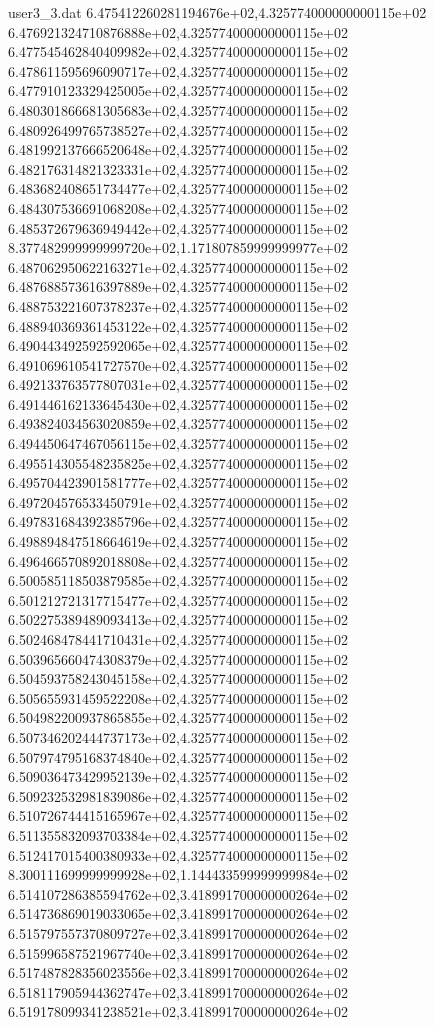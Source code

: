 \begin{filecontents}{user3_3.dat}
6.475412260281194676e+02,4.325774000000000115e+02
6.476921324710876888e+02,4.325774000000000115e+02
6.477545462840409982e+02,4.325774000000000115e+02
6.478611595696090717e+02,4.325774000000000115e+02
6.477910123329425005e+02,4.325774000000000115e+02
6.480301866681305683e+02,4.325774000000000115e+02
6.480926499765738527e+02,4.325774000000000115e+02
6.481992137666520648e+02,4.325774000000000115e+02
6.482176314821323331e+02,4.325774000000000115e+02
6.483682408651734477e+02,4.325774000000000115e+02
6.484307536691068208e+02,4.325774000000000115e+02
6.485372679636949442e+02,4.325774000000000115e+02
8.377482999999999720e+02,1.171807859999999977e+02
6.487062950622163271e+02,4.325774000000000115e+02
6.487688573616397889e+02,4.325774000000000115e+02
6.488753221607378237e+02,4.325774000000000115e+02
6.488940369361453122e+02,4.325774000000000115e+02
6.490443492592592065e+02,4.325774000000000115e+02
6.491069610541727570e+02,4.325774000000000115e+02
6.492133763577807031e+02,4.325774000000000115e+02
6.491446162133645430e+02,4.325774000000000115e+02
6.493824034563020859e+02,4.325774000000000115e+02
6.494450647467056115e+02,4.325774000000000115e+02
6.495514305548235825e+02,4.325774000000000115e+02
6.495704423901581777e+02,4.325774000000000115e+02
6.497204576533450791e+02,4.325774000000000115e+02
6.497831684392385796e+02,4.325774000000000115e+02
6.498894847518664619e+02,4.325774000000000115e+02
6.496466570892018808e+02,4.325774000000000115e+02
6.500585118503879585e+02,4.325774000000000115e+02
6.501212721317715477e+02,4.325774000000000115e+02
6.502275389489093413e+02,4.325774000000000115e+02
6.502468478441710431e+02,4.325774000000000115e+02
6.503965660474308379e+02,4.325774000000000115e+02
6.504593758243045158e+02,4.325774000000000115e+02
6.505655931459522208e+02,4.325774000000000115e+02
6.504982200937865855e+02,4.325774000000000115e+02
6.507346202444737173e+02,4.325774000000000115e+02
6.507974795168374840e+02,4.325774000000000115e+02
6.509036473429952139e+02,4.325774000000000115e+02
6.509232532981839086e+02,4.325774000000000115e+02
6.510726744415165967e+02,4.325774000000000115e+02
6.511355832093703384e+02,4.325774000000000115e+02
6.512417015400380933e+02,4.325774000000000115e+02
8.300111699999999928e+02,1.144433599999999984e+02
6.514107286385594762e+02,3.418991700000000264e+02
6.514736869019033065e+02,3.418991700000000264e+02
6.515797557370809727e+02,3.418991700000000264e+02
6.515996587521967740e+02,3.418991700000000264e+02
6.517487828356023556e+02,3.418991700000000264e+02
6.518117905944362747e+02,3.418991700000000264e+02
6.519178099341238521e+02,3.418991700000000264e+02

\end{filecontents}
